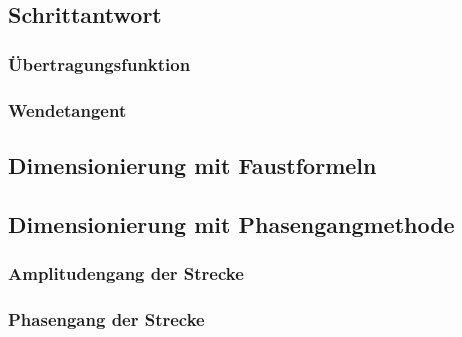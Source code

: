 \subsection{Schrittantwort}
\subsubsection{Übertragungsfunktion}
\subsubsection{Wendetangent}
\subsection{Dimensionierung mit Faustformeln}
\subsection{Dimensionierung mit  Phasengangmethode}
\subsubsection{Amplitudengang der Strecke}
\subsubsection{Phasengang der Strecke}